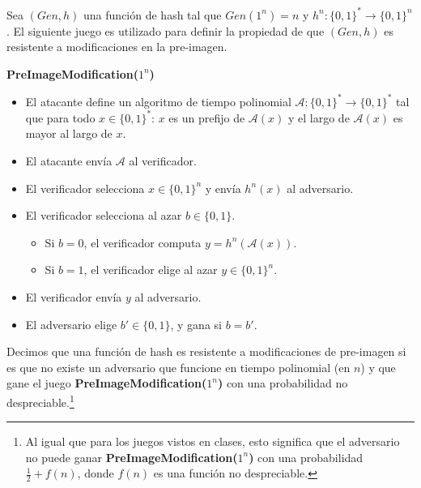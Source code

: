 
Sea $(\textit{Gen}, h)$ una función de hash tal que $\textit{Gen}(1^n) = n$ y  $h^n : \{0,1\}^* \to \{0,1\}^n$. El siguiente juego es utilizado para definir la propiedad de que $(\textit{Gen}, h)$ es resistente a modificaciones en la pre-imagen.

{\bf PreImageModification($1^n$)}
\begin{itemize}
\item El atacante define un algoritmo de tiempo polinomial $\mathcal{A}:\{0,1\}^*\rightarrow\{0,1\}^*$ tal que para todo $x \in \{0,1\}^*$: $x$ es un prefijo de $\mathcal{A}(x)$ y el largo de $\mathcal{A}(x)$ es mayor al largo de $x$.
\item El atacante envía $\mathcal{A}$ al verificador.
\item El verificador selecciona $x\in\{0, 1\}^n$ y envía $h^n(x)$ al adversario.
\item El verificador selecciona al azar $b\in\{0, 1\}$.
\begin{itemize}
\item Si $b=0$, el verificador computa $y=h^n(\mathcal{A}(x))$.
\item Si $b=1$, el verificador elige al azar $y\in\{0,1\}^n$.
\end{itemize}
\item El verificador envía $y$ al adversario.
\item El adversario elige $b'\in\{0,1\}$, y gana si $b=b'$.
\end{itemize}
Decimos que una función de hash es resistente a modificaciones de pre-imagen si es que no existe un adversario que funcione en tiempo polinomial (en $n$) y que gane el juego {\bf PreImageModification($1^n$)} con una probabilidad no despreciable.\footnote{Al igual que para los juegos vistos en clases, esto significa que el adversario no puede ganar {\bf PreImageModification($1^n$)} con una probabilidad $\frac{1}{2} + f(n)$, donde $f(n)$ es una función no despreciable.}
